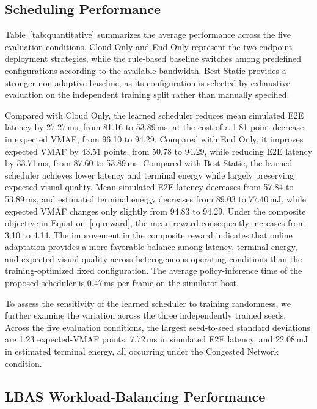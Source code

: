 \documentclass[10pt,journal,compsoc]{IEEEtran}
\begin{document}
\subsection{Scheduling Performance}
\label{sec:scheduling_performance}

Table~\ref{tab:quantitative} summarizes the average performance across the five evaluation conditions. Cloud Only and End Only represent the two endpoint deployment strategies, while the rule-based baseline switches among predefined configurations according to the available bandwidth. Best Static provides a stronger non-adaptive baseline, as its configuration is selected by exhaustive evaluation on the independent training split rather than manually specified. 

Compared with Cloud Only, the learned scheduler reduces mean simulated E2E latency by 27.27\,ms, from 81.16 to 53.89\,ms, at the cost of a 1.81-point decrease in expected VMAF, from 96.10 to 94.29. Compared with End Only, it improves expected VMAF by 43.51 points, from 50.78 to 94.29, while reducing E2E latency by 33.71\,ms, from 87.60 to 53.89\,ms. Compared with Best Static, the learned scheduler achieves lower latency and terminal energy while largely preserving expected visual quality. Mean simulated E2E latency decreases from 57.84 to 53.89\,ms, and estimated terminal energy decreases from 89.03 to 77.40\,mJ, while expected VMAF changes only slightly from 94.83 to 94.29. Under the composite objective in Equation~\ref{eq:reward}, the mean reward consequently increases from 3.10 to 4.14. The improvement in the composite reward indicates that online adaptation provides a more favorable balance among latency, terminal energy, and expected visual quality across heterogeneous operating conditions than the training-optimized fixed configuration. The average policy-inference time of the proposed scheduler is 0.47\,ms per frame on the simulator host.

To assess the sensitivity of the learned scheduler to training randomness, we further examine the variation across the three independently trained seeds. Across the five evaluation conditions, the largest seed-to-seed standard deviations are 1.23 expected-VMAF points, 7.72\,ms in simulated E2E latency, and 22.08\,mJ in estimated terminal energy, all occurring under the Congested Network condition.

\subsection{LBAS Workload-Balancing Performance}
\end{document}
